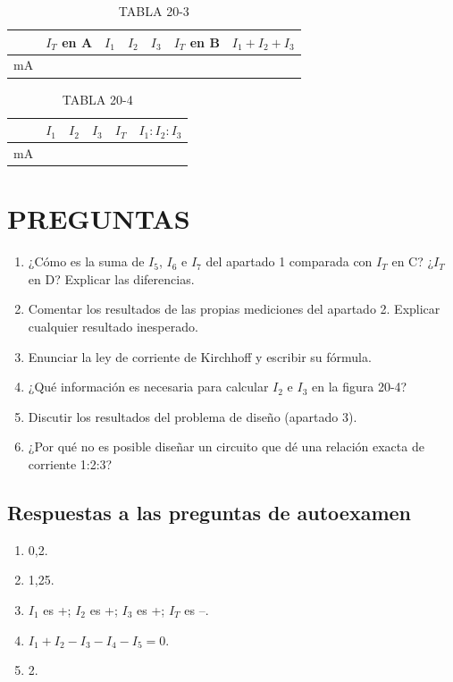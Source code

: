 \documentclass[12pt, a4paper]{article}
\begin{document}
\begin{table}[h!]
    \centering
    \caption{TABLA 20-3}
    \label{tab:20-3}
    \begin{tabular}{lcccccc}
        \toprule
        & $I_T$ en A & $I_1$ & $I_2$ & $I_3$ & $I_T$ en B & $I_1+I_2+I_3$ \\
        \midrule
        mA & & & & & & \\
        \bottomrule
    \end{tabular}
\end{table}

\begin{table}[h!]
    \centering
    \caption{TABLA 20-4}
    \label{tab:20-4}
    \begin{tabular}{lccccc}
        \toprule
        & $I_1$ & $I_2$ & $I_3$ & $I_T$ & $I_1:I_2:I_3$ \\
        \midrule
        mA & & & & & \\
        \bottomrule
    \end{tabular}
\end{table}

\section*{PREGUNTAS}
\begin{enumerate}[label=\arabic*., start=2]
    \item ¿Cómo es la suma de $I_5$, $I_6$ e $I_7$ del apartado 1 comparada con $I_T$ en C? ¿$I_T$ en D? Explicar las diferencias.
    \item Comentar los resultados de las propias mediciones del apartado 2. Explicar cualquier resultado inesperado.
    \item Enunciar la ley de corriente de Kirchhoff y escribir su fórmula.
    \item ¿Qué información es necesaria para calcular $I_2$ e $I_3$ en la figura 20-4?
    \item Discutir los resultados del problema de diseño (apartado 3).
    \item ¿Por qué no es posible diseñar un circuito que dé una relación exacta de corriente 1:2:3?
\end{enumerate}

\subsection*{Respuestas a las preguntas de autoexamen}
\begin{enumerate}[label=\arabic*.]
    \item 0,2.
    \item 1,25.
    \item $I_1$ es +; $I_2$ es +; $I_3$ es +; $I_T$ es –.
    \item $I_1 + I_2 - I_3 - I_4 - I_5 = 0$.
    \item 2.
\end{enumerate}
\end{document}
